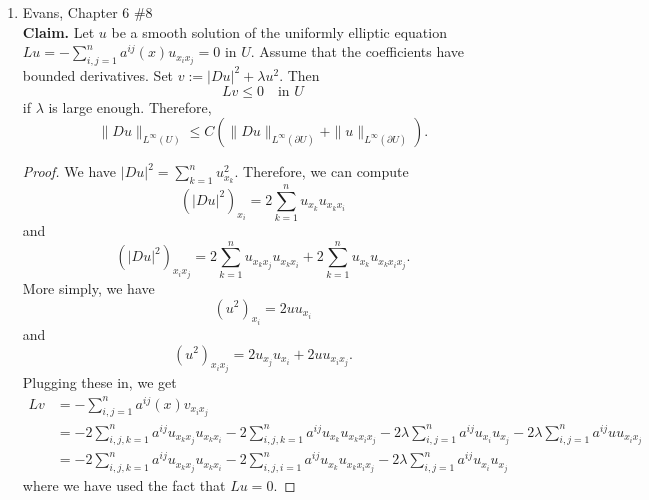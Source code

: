 \documentclass[a4paper]{article}
\newenvironment{claim}{\textbf{Claim.}}{}
\begin{document}
\begin{enumerate}
\begin{proof}
      Take $\varepsilon = \frac{1}{2C}$. Then combining $A$ and $B$, we have
      \begin{align*}
        \| D_k^h Du \|_{L^2(U)}^2 &= |A| \\
        &= |B| \\
        &\leq \int_{U}^{} C (|f|^2 + |c(u)|^2)dx + \frac{1}{2} \| D_k^h Du \|_{L^2(U)}^2
      \end{align*}
      Thus,
      \[ \| D_k^h Du \|_{L^2(U)}^2 \leq 2C \int_{U}^{} |f|^2 + |c(u)|^2 dx .\]

      Because we know $c(u) \in L^2$, we have
      \[ \|D_k^h Du \|_L^2(U)^2 \leq 2C \left( \|f\|_{L^2}^2 + \|c(u)\|_{L^2}^2 \right) .\]
      Because $c(u) \in L^2$, the right hand side is a finite constant, so by Theorem 3 in Section 5.8.2 of Evans, $Du \in H^1(U)$. Therefore, $u \in
      H^2(U)$, and $\|D^2 u\|_{L^2} \leq C' \|f\|_{L^2}$ for some constant $C'$.

    \end{proof}

  \item Evans, Chapter 6 \#8 \\
    \begin{claim}
      Let $u$ be a smooth solution of the uniformly elliptic equation $Lu = - \sum_{i,j=1}^n a^{ij}(x) u_{x_i x_j} = 0$ in $U$. Assume that the
      coefficients have bounded derivatives.
      Set $v := |Du|^2 + \lambda u^2$. Then
      \[ Lv \leq 0 \quad \text{in } U \]
      if $\lambda$ is large enough. Therefore,
      \[ \| Du \|_{L^\infty(U)} \leq C \left( \| Du \|_{L^\infty(\partial U)} + \| u \|_{L^\infty(\partial U)} \right). \]
    \end{claim}

    \begin{proof}
      We have $|Du|^2 = \sum_{k=1}^n u_{x_k}^2$. Therefore, we can compute
      \[ \left( |Du|^2 \right)_{x_i} = 2 \sum_{k=1}^n u_{x_k} u_{x_k x_i} \]
      and
      \[ \left( |Du|^2 \right)_{x_i x_j} = 2 \sum_{k=1}^n u_{x_k x_j} u_{x_k x_i} + 2 \sum_{k=1}^n u_{x_k} u_{x_k x_i x_j} .\]
      More simply, we have
      \[ (u^2)_{x_i} = 2 u u_{x_i} \]
      and
      \[ (u^2)_{x_i x_j} = 2 u_{x_j} u_{x_i} + 2 u u_{x_i x_j} .\]
      Plugging these in, we get
      \begin{align*}
        Lv &= - \sum_{i,j=1}^n a^{ij}(x) v_{x_i x_j} \\
        &= - 2 \sum_{i,j,k=1}^n a^{ij} u_{x_k x_j} u_{x_k x_i} - 2 \sum_{i,j,k=1}^n a^{ij} u_{x_k} u_{x_k x_i x_j} - 2 \lambda \sum_{i,j=1}^n a^{ij} u_{x_i} u_{x_j}
        - 2 \lambda \sum_{i,j=1}^n a^{ij} u u_{x_i x_j} \\
        &= - 2 \sum_{i,j,k=1}^n a^{ij} u_{x_k x_j} u_{x_k x_i} - 2 \sum_{i,j,i=1}^n a^{ij} u_{x_k} u_{x_k x_i x_j} - 2 \lambda \sum_{i,j=1}^n a^{ij} u_{x_i} u_{x_j}
      \end{align*}
      where we have used the fact that $Lu = 0$.


\end{proof}
\end{enumerate}
\end{document}

